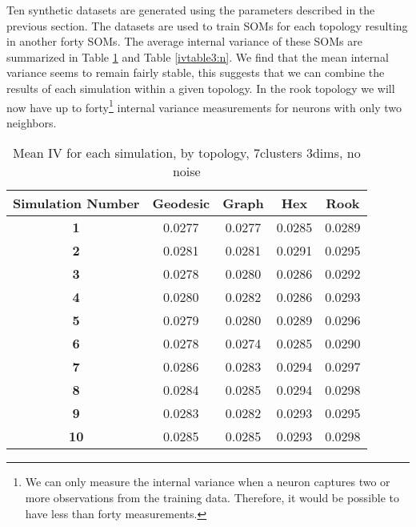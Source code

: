 Ten synthetic datasets are generated using the parameters described in the
previous section. The datasets are used to train SOMs for each topology
resulting in another forty SOMs. The average internal variance of these SOMs
are summarized in Table \ref{ivtable3} and Table \ref{ivtable3:n}.  We find that the mean internal
variance seems to remain fairly stable, this suggests that we can combine the
results of each simulation within a given topology. In the rook topology we
will now have up to forty\footnote{We can only measure the internal variance
when a neuron captures two or more observations from the training data.
Therefore, it would be possible to have less than forty measurements.}
internal variance measurements for neurons with only two neighbors.

\begin{table}[hbt]
\centering
\caption{Mean IV for each simulation, by topology, 7clusters 3dims, no noise}
\label{ivtable3}
\begin{tabular}{|c||c|c|c|c|}
\hline
\textbf{Simulation Number} & Geodesic & Graph & Hex & Rook \\
\hline
\hline
\textbf{1} & 0.0277 & 0.0277 & 0.0285 & 0.0289 \\
\hline
\textbf{2} & 0.0281 & 0.0281 & 0.0291 & 0.0295 \\
\hline
\textbf{3} & 0.0278 & 0.0280 & 0.0286 & 0.0292 \\
\hline
\textbf{4} & 0.0280 & 0.0282 & 0.0286 & 0.0293 \\
\hline
\textbf{5} & 0.0279 & 0.0280 & 0.0289 & 0.0296 \\
\hline
\textbf{6} & 0.0278 & 0.0274 & 0.0285 & 0.0290 \\
\hline
\textbf{7} & 0.0286 & 0.0283 & 0.0294 & 0.0297 \\
\hline
\textbf{8} & 0.0284 & 0.0285 & 0.0294 & 0.0298 \\
\hline
\textbf{9} & 0.0283 & 0.0282 & 0.0293 & 0.0295 \\
\hline
\textbf{10} & 0.0285 & 0.0285 & 0.0293 & 0.0298 \\
\hline
\end{tabular} \end{table}


